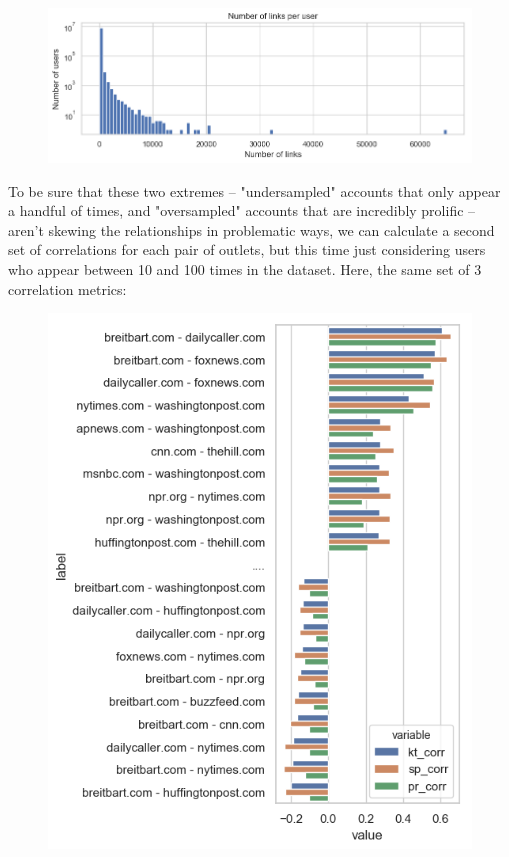 \documentclass{scrartcl}
\begin{document}
\begin{figure}[H]
  \centering
  \includegraphics[width=\textwidth]{figures/links-per-user.png}
\end{figure}

To be sure that these two extremes -- "undersampled" accounts that only appear a handful of times, and "oversampled" accounts that are incredibly prolific -- aren't skewing the relationships in problematic ways, we can calculate a second set of correlations for each pair of outlets, but this time just considering users who appear between 10 and 100 times in the dataset. Here, the same set of 3 correlation metrics:

\begin{figure}[H]
  \centering
  \includegraphics[height=0.4\textheight]{figures/user-graph-bars-10-100.png}
\end{figure}
\end{document}
